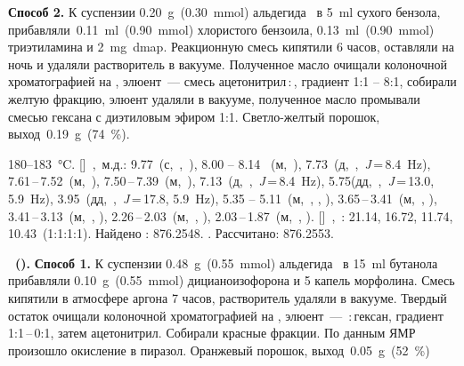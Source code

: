 \textbf{Способ 2.} К суспензии \SI{0.20}{\gram}~(\SI{0.30}{\mmol}) альдегида~\textbf{} в \SI{5}{\milli\litre} сухого бензола, прибавляли~\SI{0.11}{\milli\litre}~(\SI{0.90}{\mmol}) хлористого бензоила, \SI{0.13}{\milli\litre}~(\SI{0.90}{\mmol}) триэтиламина и \SI{2}{\milli\gram}~\ac{dmap}.
Реакционную смесь кипятили 6 часов, оставляли на ночь и удаляли растворитель в вакууме.
Полученное масло очищали колоночной хроматографией на , элюент~--- смесь ацетонитрил\,:\,, градиент 1:1 -- 8:1, собирали желтую фракцию, элюент удаляли в вакууме, полученное масло промывали смесью гексана с диэтиловым эфиром 1:1. Светло-желтый порошок, выход~\SI{0.19}{\gram}~(\SI{74}{\percent}).
\begin{experimental}
     180--\SI{183}{\celsius}.
    []~\chemdelta,~м.д.: 9.77~(с,~,~), 8.00 -- 8.14 ~(м,~), 7.73~(д,~,~\textit{J}\,=\,8.4~\si{\hertz}), 7.61\,--\,7.52~(м,~), 7.50\,--\,7.39~(м,~), 7.13~(д,~,~\textit{J}\,=\,8.4~\si{\hertz}), 5.75(дд,~,~\textit{J}\,=\,13.0, 5.9~\si{\hertz}), 3.95~(дд,~,~\textit{J}\,=\,17.8, 5.9~\si{\hertz}), 5.35 -- 5.11~(м,~, , ), 3.65\,--\,3.41~(м,~, ), 3.41\,--\,3.13~(м,~, ), 2.26\,--\,2.03~(м,~, ), 2.03\,--\,1.87~(м,~, ).
    []~\chemdelta,~\si{\ppm}: 21.14, 16.72, 11.74, 10.43~(1:1:1:1).
     Найдено \ce{[M+]}: \num{876.2548}. . Рассчитано:  \num{876.2553}.
\end{experimental}

\textbf{~().}
\textbf{Способ 1.} К суспензии \SI{0.48}{\gram}~(\SI{0.55}{\mmol}) альдегида~ в \SI{15}{\milli\litre} бутанола прибавляли \SI{0.10}{\gram}~(\SI{0.55}{\mmol}) дицианоизофорона и 5 капель морфолина. Смесь кипятили в атмосфере аргона 7 часов, растворитель удаляли в вакууме. Твердый остаток очищали колоночной хроматографией на , элюент~--- \,:\,гексан, градиент 1:1\,--\,0:1, затем ацетонитрил. Собирали красные фракции. По данным ЯМР произошло окисление в пиразол.  Оранжевый порошок, выход~\SI{0.05}{\gram}~(\SI{52}{\percent}) 

